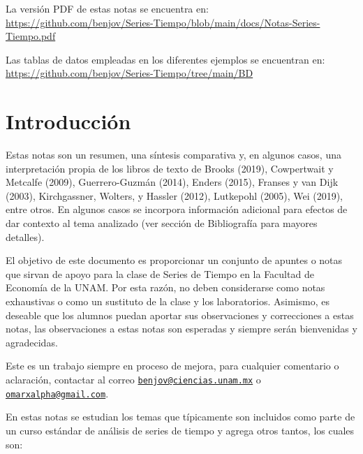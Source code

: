 \documentclass[
]{book}
\begin{document}
La versión PDF de estas notas se encuentra en: \url{https://github.com/benjov/Series-Tiempo/blob/main/docs/Notas-Series-Tiempo.pdf}

Las tablas de datos empleadas en los diferentes ejemplos se encuentran en: \url{https://github.com/benjov/Series-Tiempo/tree/main/BD}

\hypertarget{introducciuxf3n}{%
\chapter{Introducción}\label{introducciuxf3n}}

Estas notas son un resumen, una síntesis comparativa y, en algunos casos, una interpretación propia de los libros de texto de Brooks (2019), Cowpertwait y Metcalfe (2009), Guerrero-Guzmán (2014), Enders (2015), Franses y van Dijk (2003), Kirchgassner, Wolters, y Hassler (2012), Lutkepohl (2005), Wei (2019), entre otros. En algunos casos se incorpora información adicional para efectos de dar contexto al tema analizado (ver sección de Bibliografía para mayores detalles).

El objetivo de este documento es proporcionar un conjunto de apuntes o notas que sirvan de apoyo para la clase de Series de Tiempo en la Facultad de Economía de la UNAM. Por esta razón, no deben considerarse como notas exhaustivas o como un sustituto de la clase y los laboratorios. Asimismo, es deseable que los alumnos puedan aportar sus observaciones y correcciones a estas notas, las observaciones a estas notas son esperadas y siempre serán bienvenidas y agradecidas.

Este es un trabajo siempre en proceso de mejora, para cualquier comentario o aclaración, contactar al correo \href{mailto:benjov@ciencias.unam.mx}{\nolinkurl{benjov@ciencias.unam.mx}} o \href{mailto:omarxalpha@gmail.com}{\nolinkurl{omarxalpha@gmail.com}}.

En estas notas se estudian los temas que típicamente son incluidos como parte de un curso estándar de análisis de series de tiempo y agrega otros tantos, los cuales son:
\end{document}
